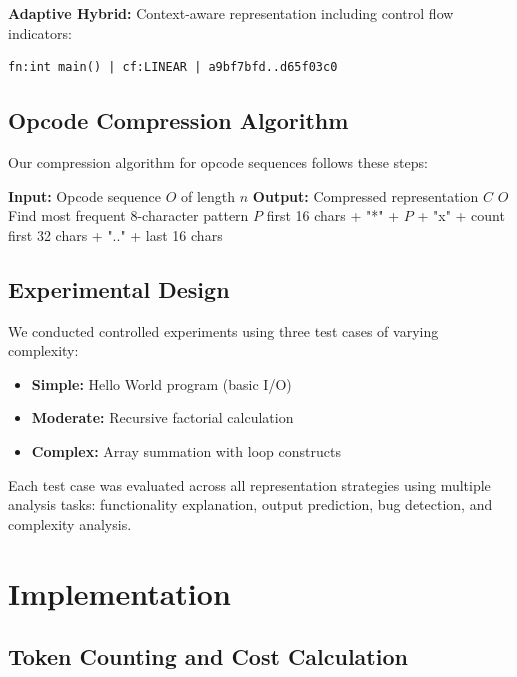 \documentclass[conference]{IEEEtran}
\begin{document}
\textbf{Adaptive Hybrid:} Context-aware representation including control flow indicators:
\begin{verbatim}
fn:int main() | cf:LINEAR | a9bf7bfd..d65f03c0
\end{verbatim}

\subsection{Opcode Compression Algorithm}

Our compression algorithm for opcode sequences follows these steps:

\begin{algorithmic}
\STATE \textbf{Input:} Opcode sequence $O$ of length $n$
\STATE \textbf{Output:} Compressed representation $C$
    \RETURN $O$
\ENDIF
\STATE Find most frequent 8-character pattern $P$
    \RETURN first 16 chars + "*" + $P$ + "x" + count
\ELSE
    \RETURN first 32 chars + ".." + last 16 chars
\ENDIF
\end{algorithmic}

\subsection{Experimental Design}

We conducted controlled experiments using three test cases of varying complexity:

\begin{itemize}
\item \textbf{Simple:} Hello World program (basic I/O)
\item \textbf{Moderate:} Recursive factorial calculation
\item \textbf{Complex:} Array summation with loop constructs
\end{itemize}

Each test case was evaluated across all representation strategies using multiple analysis tasks: functionality explanation, output prediction, bug detection, and complexity analysis.

\section{Implementation}

\subsection{Token Counting and Cost Calculation}
\end{document}
